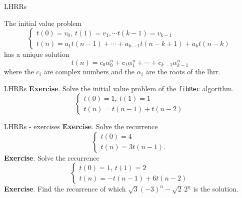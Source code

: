\documentclass{beamer}
\begin{document}
%

\begin{frame}{LHRRs}
	\begin{thm}[1]\label{thmhr}
		The initial value problem
		\begin{displaymath}
			\begin{cases}
				t(0)= v_0,\ t(1)= v_1,\cdots t(k-1)= v_{k-1}\\
				t(n)= a_1t(n-1) + \cdots + a_{k-1}t(n-k+1) + a_kt(n-k)
			\end{cases}
		\end{displaymath}
		has a unique solution
		\begin{equation*}
			t(n) = c_0\alpha_0^n + c_1\alpha_1^n + \cdots + c_{k-1}\alpha_{k-1}^n
		\end{equation*}
		where the $c_i$ are complex numbers and the $\alpha_i$ are the roots of
		the lhrr.
	\end{thm}
\end{frame}

\begin{frame}{LHRRs}
	\textbf{Exercise}. Solve the initial value problem of the \texttt{fibRec}
	algorithm.
	\begin{displaymath}
		\begin{cases}
			t(0)= 1,\ t(1)= 1\\
			t(n)= t(n-1) + t(n-2)
		\end{cases}
	\end{displaymath}
\end{frame}

\begin{frame}{LHRRs - exercises}
	\textbf{Exercise}. Solve the recurrence
	\begin{displaymath}
		\begin{cases}
			t(0)= 4\\
			t(n)= 3t(n-1).
		\end{cases}
	\end{displaymath}
	\textbf{Exercise}. Solve the recurrence
	\begin{displaymath}
		\begin{cases}
			t(0)= 1,\ t(1)= 2\\
			t(n)= -t(n-1) + 6t(n-2)
		\end{cases}
	\end{displaymath}
	\textbf{Exercise}. Find the recurrence of which $\sqrt{3}(-3)^n - \sqrt{2}\, 2^n$
	is the solution.
\end{frame}

%
\end{document}
